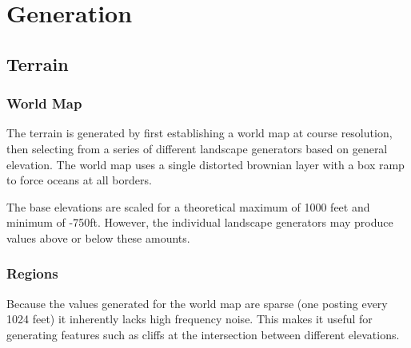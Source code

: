
\chapter{Generation}

\section {Terrain}

\subsection{World Map}

The terrain is generated by first establishing a world map at course resolution, then selecting from a series of different landscape generators based on general elevation.
The world map uses a single distorted brownian layer with a box ramp to force oceans at all borders.

The base elevations are scaled for a theoretical maximum of 1000 feet and minimum of -750ft.
However, the individual landscape generators may produce values above or below these amounts.

\subsection{Regions}

Because the values generated for the world map are sparse (one posting every 1024 feet) it inherently lacks high frequency noise.
This makes it useful for generating features such as cliffs at the intersection between different elevations.


